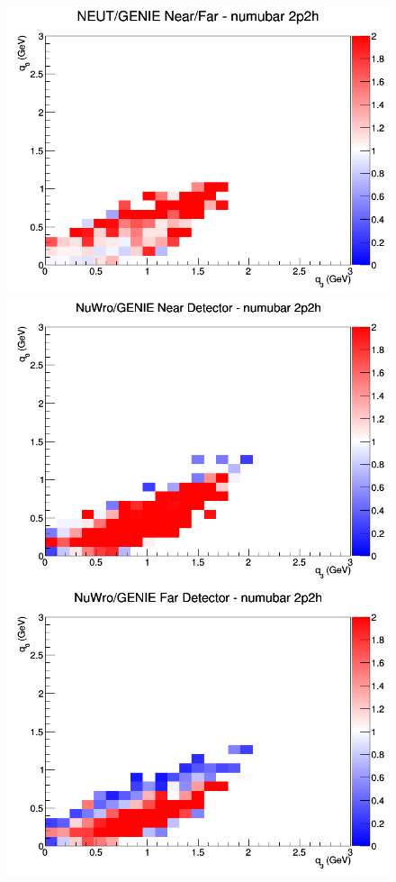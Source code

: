 \begin{figure}[h]
\endminipage
{}
\includegraphics[width=\linewidth]{eff_q0_q3/LAr/ratios/2p2h_NEUT_GENIE_numubar_NF_q3_q0.png}
\endminipage
\newline
{}
\includegraphics[width=\linewidth]{eff_q0_q3/LAr/ratios/2p2h_NuWro_GENIE_numubar_near_q3_q0.png}
\endminipage
{}
\includegraphics[width=\linewidth]{eff_q0_q3/LAr/ratios/2p2h_NuWro_GENIE_numubar_far_q3_q0.png}

\end{figure}
